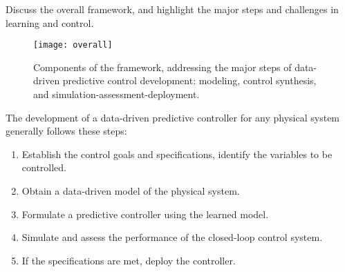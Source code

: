 \begin{todo}
  Discuss the overall framework, and highlight the major steps and challenges in learning and control.
\end{todo}

\begin{figure}[!t]
  \centering
  \texttt{[image: overall]}
  \caption{Components of the framework, addressing the major steps of data-driven predictive control development: modeling, control synthesis, and simulation-assessment-deployment.}
  \label{fig:overall}
\end{figure}

The development of a data-driven predictive controller for any physical system generally follows these steps:
\begin{enumerate}
\item Establish the control goals and specifications, identify the variables to be controlled.
\item Obtain a data-driven model of the physical system. 
\item Formulate a predictive controller using the learned model.
\item Simulate and assess the performance of the closed-loop control system.
\item If the specifications are met, deploy the controller.
\end{enumerate}


